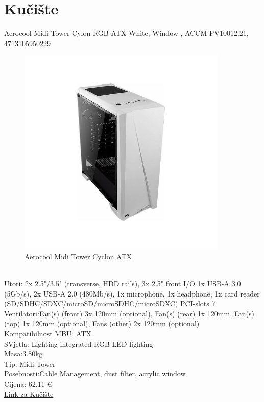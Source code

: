 \documentclass{article}
\begin{document}
\section{Kučište}
Aerocool Midi Tower Cylon RGB ATX White, Window , ACCM-PV10012.21, 4713105950229
\begin{figure}[h]
    \includegraphics[width=10cm]{case.jpg}
    \caption{Aerocool Midi Tower Cyclon ATX}
\end{figure}\\
Utori: 2x 2.5"/3.5" (transverse, HDD rails), 3x 2.5"
front I/O 1x USB-A 3.0 (5Gb/s), 2x USB-A 2.0 (480Mb/s), 1x microphone, 1x headphone, 1x card reader (SD/SDHC/SDXC/microSD/microSDHC/microSDXC)
PCI-slots 7\\
Ventilatori:Fan(s) (front) 3x 120mm (optional), Fan(s) (rear) 1x 120mm, Fan(s) (top) 1x 120mm (optional), Fans (other) 2x 120mm (optional)\\
Kompatibilnost MBU: ATX\\
SVjetla: Lighting integrated RGB-LED lighting\\
Masa:3.80kg\\
Tip: Midi-Tower\\
Posebnosti:Cable Management, dust filter, acrylic window\\
Cijena: 62,11 €\\
\href{https://www.adm.hr/aerocool-cylon-rgb-atx-white-window-accm-pv1001221/72013/product/}{Link za Kučište}
\newpage
\end{document}
